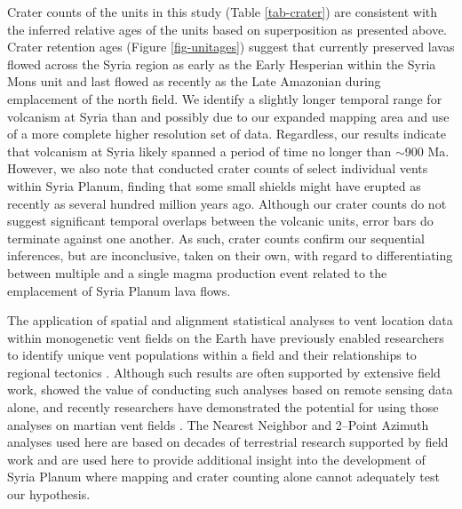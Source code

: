 \documentclass[preprint,review,authoryear,12pt]{elsarticle}
\begin{document}
Crater counts of the units in this study (Table \ref{tab-crater}) are consistent with the inferred relative ages of the units based on superposition as presented above. Crater retention ages (Figure \ref{fig-unitages}) suggest that currently preserved lavas flowed across the Syria region as early as the Early Hesperian within the Syria Mons unit and last flowed as recently as the Late Amazonian during emplacement of the north field. We identify a slightly longer temporal range for volcanism at Syria than \citet{Plescia2004} and \citet{Baptista2008} possibly due to our expanded mapping area and use of a more complete higher resolution set of data. Regardless, our results indicate that volcanism at Syria likely spanned a period of time no longer than $\sim$900 Ma. However, we also note that \citet{Hauber2011} conducted crater counts of select individual vents within Syria Planum, finding that some small shields might have erupted as recently as several hundred million years ago. Although our crater counts do not suggest significant temporal overlaps between the volcanic units, error bars do terminate against one another. As such, crater counts confirm our sequential inferences, but are inconclusive, taken on their own, with regard to differentiating between multiple and a single magma production event related to the emplacement of Syria Planum lava flows. 

The application of spatial and alignment statistical analyses to vent location data within monogenetic vent fields on the Earth have previously enabled researchers to identify unique vent populations within a field and their relationships to regional tectonics \citep[e.g.]{Connor2000}. Although such results are often supported by extensive field work, \citet{Bishop2007} showed the value of conducting such analyses based on remote sensing data alone, and recently researchers have demonstrated the potential for using those analyses on martian vent fields \citep{Bishop2008,Bleacher2009,Hamilton2010,Hamilton2011}. The Nearest Neighbor and 2--Point Azimuth analyses used here are based on decades of terrestrial research supported by field work and are used here to provide additional insight into the development of Syria Planum where mapping and crater counting alone cannot adequately test our hypothesis. 
\end{document}
